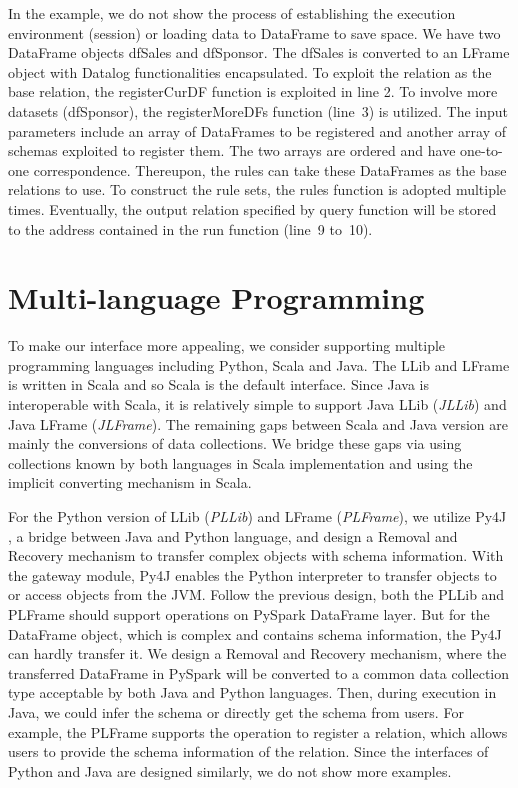 In the example, we do not show the process of establishing the execution environment (session) or loading data to DataFrame to save space. We have  two  DataFrame objects dfSales and dfSponsor. The dfSales is converted to an LFrame object with Datalog functionalities encapsulated. To exploit the relation as the base relation, the registerCurDF function is exploited in line 2. 
To involve more datasets (dfSponsor), the registerMoreDFs function (line~3) is utilized. The input parameters include an array of DataFrames to be registered and another array of schemas exploited to register them. The two arrays are ordered and have one-to-one correspondence. Thereupon, the rules can take these DataFrames as the base relations to use. To construct the rule sets, the rules function is adopted multiple times. Eventually, the output relation specified by query function will be stored to the address contained in the run function (line~9 to~10).  



\section{Multi-language Programming}
\label{multi}
To make our interface more appealing, we consider supporting multiple programming languages including Python, Scala and Java. The LLib and LFrame is written in Scala and so Scala is the default  interface. Since Java is interoperable with Scala, it is relatively simple to support Java LLib (\textit{JLLib}) and Java LFrame (\textit{JLFrame}). The remaining gaps between Scala and Java version are mainly the conversions of data collections. We bridge these gaps via using collections known by both languages in Scala implementation and using the implicit converting mechanism in Scala.

For the Python version of LLib (\textit{PLLib}) and LFrame (\textit{PLFrame}), we utilize Py4J \citep{py4j}, a bridge between Java and Python language, and design a Removal and Recovery mechanism to transfer complex objects with schema information. With the gateway module, Py4J enables the Python interpreter to transfer objects to or  access objects from the JVM. Follow the previous design, both the PLLib and PLFrame should support operations on PySpark DataFrame layer. But for the DataFrame object, which is complex and contains schema information, the Py4J can hardly transfer it. We design a Removal and Recovery mechanism, where the transferred DataFrame in PySpark will be converted to a common data collection type acceptable by both Java and Python languages. Then, during execution in Java, we could infer the schema or directly get the schema from users. For example, the PLFrame supports the operation to register a relation, which allows users to provide the schema information of the relation. 
Since the interfaces of Python and Java are designed similarly, we do not show more examples.

